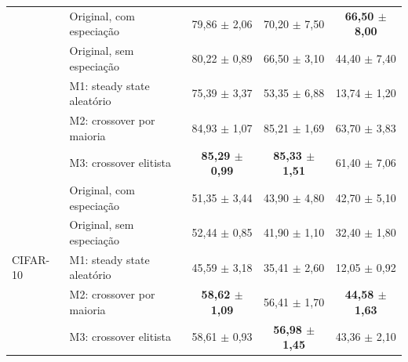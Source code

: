 \begin{table}[t]
{\begin{tabular}{llccc}
 & Original, com especiação & 79,86 $\pm$ 2,06 & 70,20 $\pm$ 7,50 & \textbf{66,50 $\pm$ 8,00} \\
 & Original, sem especiação & 80,22 $\pm$ 0,89 & 66,50 $\pm$ 3,10 & 44,40 $\pm$ 7,40 \\
 & M1: steady state aleatório & 75,39 $\pm$ 3,37 & 53,35 $\pm$ 6,88 & 13,74 $\pm$ 1,20 \\
 & M2: crossover por maioria  & 84,93 $\pm$ 1,07 & 85,21 $\pm$ 1,69 & 63,70 $\pm$ 3,83 \\
 & M3: crossover elitista     & \textbf{85,29 $\pm$ 0,99} & \textbf{85,33 $\pm$ 1,51} & 61,40 $\pm$ 7,06 \\
\midrule
\multirow{5}{*}{CIFAR-10}
 & Original, com especiação & 51,35 $\pm$ 3,44 & 43,90 $\pm$ 4,80 & 42,70 $\pm$ 5,10 \\
 & Original, sem especiação & 52,44 $\pm$ 0,85 & 41,90 $\pm$ 1,10 & 32,40 $\pm$ 1,80 \\
 & M1: steady state aleatório & 45,59 $\pm$ 3,18 & 35,41 $\pm$ 2,60 & 12,05 $\pm$ 0,92 \\
 & M2: crossover por maioria  & \textbf{58,62 $\pm$ 1,09} & 56,41 $\pm$ 1,70 & \textbf{44,58 $\pm$ 1,63} \\
 & M3: crossover elitista     & 58,61 $\pm$ 0,93 & \textbf{56,98 $\pm$ 1,45} & 43,36 $\pm$ 2,10 \\
\bottomrule
\end{tabular}}
\end{table}
